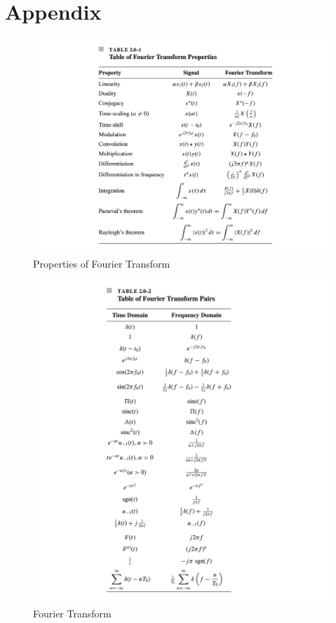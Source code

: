 \section{Appendix}
\begin{figure}[htbp]
\centering
\includegraphics[width=\linewidth]{img/Appendix1.png}
\caption{Properties of Fourier Transform \cite{DC}}
\label{App1}
\end{figure}

\begin{figure}[htbp]
\centering
\includegraphics[width=\linewidth]{img/Appendix2.png}
\caption{Fourier Transform \cite{DC}}
\label{App2}
\end{figure}